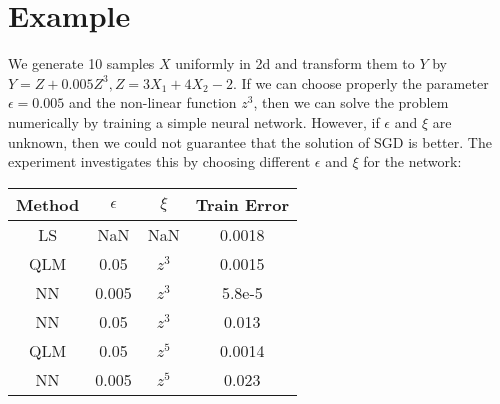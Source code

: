 \documentclass{article}
\begin{document}
\section{Example}
We generate 10 samples $X$ uniformly in 2d and transform them to $Y$ by $Y=Z + 0.005 Z^3, Z = 3X_1 + 4X_2 -2$.
If we can choose properly the parameter $\epsilon = 0.005$ and the non-linear function $z^3$, then we can solve the problem numerically by
training a simple neural network. However, if $\epsilon$ and $\xi$ are unknown, then we could not guarantee that the solution of SGD is better.
The experiment investigates this by choosing different $\epsilon$ and $\xi$ for the network:
\begin{table}[!ht]
	\centering
	\begin{tabular}{cccc}
	 \hline
	 Method & $\epsilon$ & $\xi$ & Train Error \\
	 \hline
	 LS & NaN & NaN & 0.0018 \\
	 QLM & 0.05 & $z^3$ & 0.0015 \\
	 NN & 0.005 & $z^3$ & 5.8e-5\\
	 NN & 0.05 & $z^3$ & 0.013 \\
	 QLM & 0.05 & $z^5$ & 0.0014 \\
	 NN & 0.005 & $z^5$ & 0.023 \\
	 \hline
	\end{tabular}
\end{table}


\end{document}
